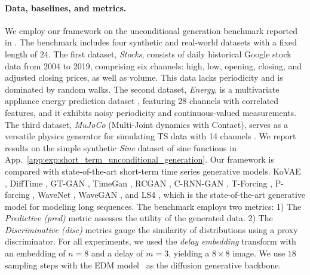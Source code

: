 \documentclass{article}
\begin{document}
\paragraph{Data, baselines, and metrics.} We employ our framework on the unconditional generation benchmark reported in \cite{coletta2024constrained}. The benchmark includes four synthetic and real-world datasets with a fixed length of $24$. The first dataset, \textit{Stocks}, consists of daily historical Google stock data from 2004 to 2019, comprising six channels: high, low, opening, closing, and adjusted closing prices, as well as volume. This data lacks periodicity and is dominated by random walks. The second dataset, \textit{Energy}, is a multivariate appliance energy prediction dataset \cite{candanedo2017data}, featuring 28 channels with correlated features, and it exhibits noisy periodicity and continuous-valued measurements. The third dataset, \textit{MuJoCo} (Multi-Joint dynamics with Contact), serves as a versatile physics generator for simulating TS data with 14 channels \cite{todorov2012mujoco}. We report results on the simple synthetic \textit{Sine} dataset of sine functions in App.~\ref{app:exp:short_term_unconditional_generation}. Our framework is compared with state-of-the-art short-term time series generative models. KoVAE \cite{naiman2024generative}, DiffTime \cite{coletta2024constrained}, GT-GAN \cite{jeon2022gt}, TimeGan \cite{yoon2019time}, RCGAN \cite{esteban2017real}, C-RNN-GAN \cite{mogren2016continuous}, T-Forcing \cite{graves2013generating}, P-forcing \cite{lamb2016professor}, WaveNet \cite{van2016wavenet}, WaveGAN \cite{donahue2018adversarial}, and LS4 \cite{zhou2023deep}, which is the state-of-the-art generative model for modeling long sequences. The benchmark employs two metrics: 1) The \textit{Predictive (pred)} metric assesses the utility of the generated data. 2) The \textit{Discriminative (disc)} metrics gauge the similarity of distributions using a proxy discriminator. For all experiments, we used the \textit{delay embedding} transform with an embedding of $n=8$ and a delay of $m=3$, yielding a $8 \times 8$ image. We use $18$ sampling steps with the EDM model~\cite{karras2022elucidating} as the diffusion generative backbone.  
\end{document}

